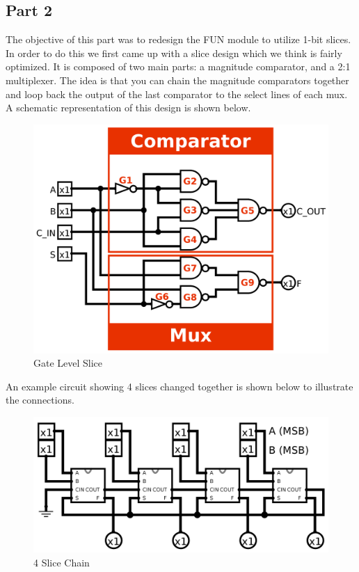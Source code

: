 \documentclass{article}
\begin{document}
\newpage
\subsection*{Part 2}

The objective of this part was to redesign the FUN module to utilize 1-bit
slices. In order to do this we first came up with a slice design which we think
is fairly optimized. It is composed of two main parts: a magnitude comparator,
and a 2:1 multiplexer. The idea is that you can chain the magnitude comparators
together and loop back the output of the last comparator to the select lines of
each mux. A schematic representation of this design is shown below.

\begin{figure}[H]
    \centering
    \includegraphics[width=0.75\linewidth]{../logisim/logisim_bitslice_gates_labeled.png}
    \caption{Gate Level Slice}
\end{figure}

An example circuit showing 4 slices changed together is shown below to
illustrate the connections.

\begin{figure}[H]
    \centering
    \includegraphics[width=0.75\linewidth]{../logisim/logisim_main.png}
    \caption{4 Slice Chain}
\end{figure}
\end{document}
